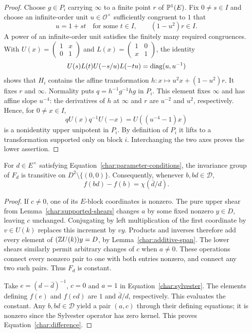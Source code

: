 \begin{proof}
Choose $g\in P_i$ carrying $\infty$ to a finite point $r$ of
$\mathbb P^1(E)$. Fix $0\ne s\in I$ and choose an infinite-order unit
$u\in\mathcal O^\times$ sufficiently congruent to $1$ that
\[
 u=1+st\quad\text{for some }t\in I,
 \qquad (1-u^2)r\in I.
\]
A power of an infinite-order unit satisfies the finitely many required
congruences. With
$U(x)=\left(\begin{smallmatrix}1&x\\0&1\end{smallmatrix}\right)$
and
$L(x)=\left(\begin{smallmatrix}1&0\\x&1\end{smallmatrix}\right)$,
the identity
\[
 U(s)L(t)U(-s/u)L(-tu)=\operatorname{diag}(u,u^{-1})
\]
shows that $H_i$ contains the affine transformation
$h:x\mapsto u^2x+(1-u^2)r$. It fixes $r$ and $\infty$.
Normality puts $q=h^{-1}g^{-1}hg$ in $P_i$. This element fixes
$\infty$ and has affine slope $u^{-4}$: the derivatives of $h$ at
$\infty$ and $r$ are $u^{-2}$ and $u^2$, respectively.
Hence, for $0\ne x\in I$,
\[
 qU(x)q^{-1}U(-x)=U((u^{-4}-1)x)
\]
is a nonidentity upper unipotent in $P_i$. By definition of $P_i$
it lifts to a transformation supported only on block $i$.
Interchanging the two axes proves the lower assertion.
\end{proof}

\begin{proposition}\label{char:transitivity}
For $d\in E^\times$ satisfying
Equation~\ref{char:parameter-conditions}, the invariance group of $F_d$
is transitive on $D^2\setminus\{(0,0)\}$. Consequently, whenever
$b,bd\in\mathcal D$,
\begin{equation}\label{char:difference}
 f(bd)-f(b)=\chi(\bar d/d).
\end{equation}
\end{proposition}

\begin{proof}
If $c\ne0$, one of its $E$-block coordinates is nonzero. The pure
upper shear from Lemma~\ref{char:supported-shears} changes $a$ by
some fixed nonzero $y\in D$, leaving $c$ unchanged. Conjugating by
left multiplication of the first coordinate by $v\in U(k)$ replaces
this increment by $vy$. Products and inverses therefore add every
element of $(\mathbb Z U(k))y=D$, by Lemma~\ref{char:additive-span}.
The lower shears similarly permit arbitrary changes of $c$ when
$a\ne0$. These operations connect every nonzero pair to one with
both entries nonzero, and connect any two such pairs. Thus $F_d$ is
constant.

Take $e=(d-\bar d)^{-1}$, $c=0$ and $a=1$ in
Equation~\ref{char:sylvester}. The elements defining $f(e)$ and
$f(ed)$ are $1$ and $\bar d/d$, respectively. This evaluates the
constant. Any $b,bd\in\mathcal D$ yield a pair $(a,c)$ through their
defining equations; it is nonzero since the Sylvester operator has
zero kernel. This proves Equation~\ref{char:difference}.
\end{proof}

